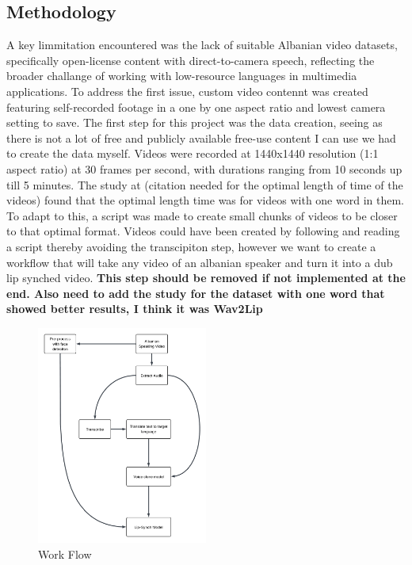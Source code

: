 \documentclass[12pt]{article}
\begin{document}
\subsection{Methodology}
A key limmitation encountered was the lack of suitable Albanian video datasets, specifically open-license content with direct-to-camera speech, reflecting the broader challange of working with low-resource languages in multimedia applications. To address the first issue, custom video contennt was created featuring self-recorded footage in a one by one aspect ratio and lowest camera setting to save. The first step for this project was the data creation, seeing as there is not a lot of free and publicly available free-use content I can use we had to create the data myself.
Videos were recorded at 1440x1440 resolution (1:1 aspect ratio) at 30 frames per second, with durations ranging from 10 seconds up till 5 minutes. The study at (citation needed for the optimal length of time of the videos) found that the optimal length time was for videos with one word in them. To adapt to this, a script was made to create small chunks of videos to be closer to that optimal format. Videos could have been created by following and reading a script thereby avoiding the transcipiton step, however we want to create a workflow that will take any video of an albanian speaker and turn it into a dub lip synched video. \textbf{This step should be removed if not implemented at the end. Also need to add the study for the dataset with one word that showed better results, I think it was Wav2Lip}

\begin{figure}[h!]
    \centering
    \includegraphics[width=0.5\textwidth]{images/work-flow.png}
    \caption{Work Flow}
    \label{fig:work-flow}
\end{figure}
\end{document}
